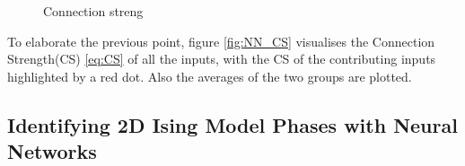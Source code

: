 \begin{figure}[H]
\qquad
{}
\caption{Connection streng}
\label{fig:NN_reg}
\end{figure}

To elaborate the previous point, figure \autoref{fig:NN_CS} visualises the Connection Strength(CS) \autoref{eq:CS} of all the inputs, with the CS of the contributing inputs highlighted by a red dot. Also the averages of the two groups are plotted. 







\subsection{Identifying 2D Ising Model Phases with Neural Networks}\label{sec:results NN reg}
